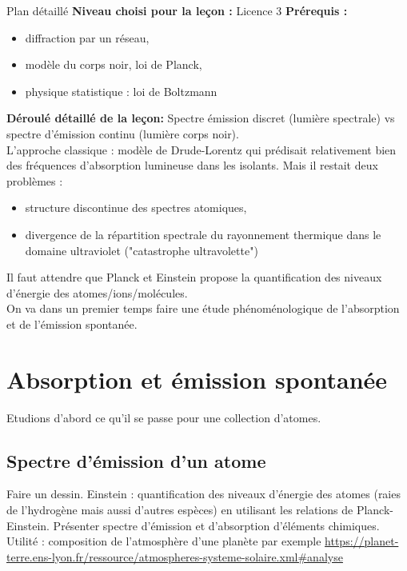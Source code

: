 \begin{reportBlock}{Plan détaillé}
  \textbf{Niveau choisi pour la leçon :} Licence 3
  \newline
  \textbf{Prérequis : }
  \begin{itemize}
      \item diffraction par un réseau,
      \item modèle du corps noir, loi de Planck,
      \item physique statistique : loi de Boltzmann
  \end{itemize}

  
  \textbf{Déroulé détaillé de la leçon: }   \newline
Spectre émission discret (lumière spectrale) vs spectre d'émission continu (lumière corps noir).\\
L'approche classique : modèle de Drude-Lorentz qui prédisait relativement bien des fréquences d'absorption lumineuse dans les isolants. Mais il restait deux problèmes :
\begin{itemize}
    \item structure discontinue des spectres atomiques,
    \item divergence de la répartition spectrale du rayonnement thermique dans le domaine ultraviolet ("catastrophe ultravolette")
\end{itemize}
Il faut attendre que Planck et Einstein propose la quantification des niveaux d'énergie des atomes/ions/molécules.\\
On va dans un premier temps faire une étude phénoménologique de l'absorption et de l'émission spontanée.
  \section{Absorption et émission spontanée}
  Etudions d'abord ce qu'il se passe pour une collection d'atomes.
  \subsection{Spectre d'émission d'un atome}
  Faire un dessin. Einstein : quantification des niveaux d'énergie des atomes (raies de l'hydrogène mais aussi d'autres espèces) en utilisant les relations de Planck-Einstein. Présenter spectre d'émission et d'absorption d'éléments chimiques. \\
  Utilité : composition de l'atmosphère d'une planète par exemple \url{https://planet-terre.ens-lyon.fr/ressource/atmospheres-systeme-solaire.xml#analyse}

\end{reportBlock}
